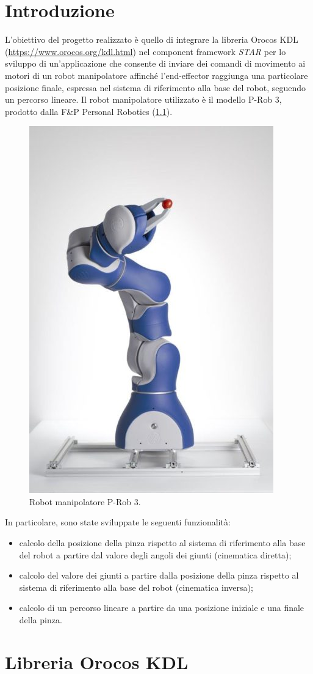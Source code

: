 
\chapter{Introduzione}
L'obiettivo del progetto realizzato è quello di integrare la libreria Orocos KDL (\url{https://www.orocos.org/kdl.html}) nel component framework \textit{STAR} per lo sviluppo di un'applicazione che consente di inviare dei comandi di movimento ai motori di un robot manipolatore affinché l'end-effector raggiunga una particolare posizione finale, espressa nel sistema di riferimento alla base del robot, seguendo un percorso lineare. Il robot manipolatore utilizzato è il modello P-Rob 3, prodotto dalla F\&P Personal Robotics (\Fig\ref{fig:prob3}). 
\begin{figure}[b!]
	\centering
	\includegraphics[width=0.4\linewidth]{./ImageFiles/P-Rob 3.jpg}
	\caption{Robot manipolatore P-Rob 3.}
	\label{fig:prob3}
\end{figure}
In particolare, sono state sviluppate le seguenti funzionalità:
\begin{itemize}
	\item calcolo della posizione della pinza rispetto al sistema di riferimento alla base del robot a partire dal valore degli angoli dei giunti (cinematica diretta);
	\item calcolo del valore dei giunti a partire dalla posizione della pinza rispetto al sistema di riferimento alla base del robot (cinematica inversa);
	\item calcolo di un percorso lineare a partire da una posizione iniziale e una finale della pinza.
\end{itemize}

\chapter{Libreria Orocos KDL}
